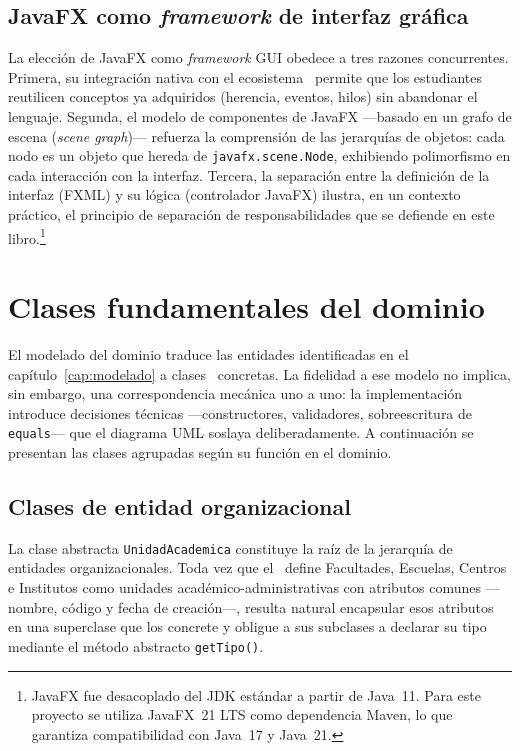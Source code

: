 \subsection{JavaFX como \textit{framework} de interfaz gráfica}

La elección de JavaFX como \textit{framework} GUI obedece a tres razones concurrentes.
Primera, su integración nativa con el ecosistema \java\ permite que los estudiantes
reutilicen conceptos ya adquiridos (herencia, eventos, hilos) sin abandonar el lenguaje.
Segunda, el modelo de componentes de JavaFX ---basado en un grafo de escena
(\textit{scene graph})--- refuerza la comprensión de las jerarquías de objetos:
cada nodo es un objeto que hereda de \texttt{javafx.scene.Node}, exhibiendo
polimorfismo en cada interacción con la interfaz. Tercera, la separación entre
la definición de la interfaz (FXML) y su lógica (controlador JavaFX) ilustra,
en un contexto práctico, el principio de separación de responsabilidades que se
defiende en este libro.\footnote{JavaFX fue desacoplado del JDK estándar a partir
de Java~11. Para este proyecto se utiliza JavaFX~21 LTS como dependencia Maven,
lo que garantiza compatibilidad con Java~17 y Java~21.}

\section{Clases fundamentales del dominio}
\label{sec:java-dominio}

\noindent
El modelado del dominio traduce las entidades identificadas en el capítulo~\ref{cap:modelado}
a clases \java\ concretas. La fidelidad a ese modelo no implica, sin embargo, una
correspondencia mecánica uno a uno: la implementación introduce decisiones técnicas
---constructores, validadores, sobreescritura de \texttt{equals}--- que el diagrama
UML soslaya deliberadamente. A continuación se presentan las clases agrupadas según
su función en el dominio.

\subsection{Clases de entidad organizacional}
\label{subsec:entidad-organizacional}

La clase abstracta \texttt{UnidadAcademica} constituye la raíz de la jerarquía
de entidades organizacionales. Toda vez que el \acuerdo\ define Facultades, Escuelas,
Centros e Institutos como unidades académico-administrativas con atributos comunes
---nombre, código y fecha de creación---, resulta natural encapsular esos atributos
en una superclase que los concrete y obligue a sus subclases a declarar su tipo mediante
el método abstracto \texttt{getTipo()}.

